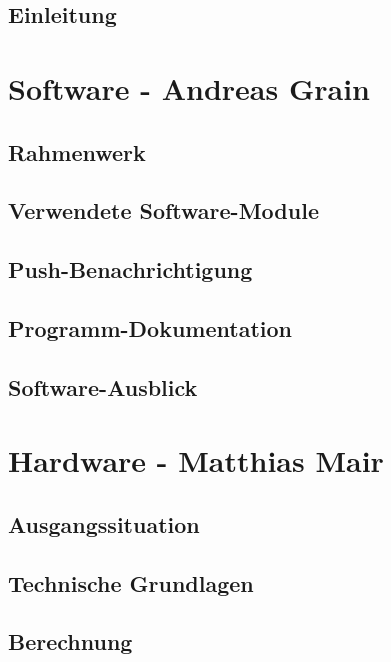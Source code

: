 \documentclass[a4paper, twoside, 12pt, openright]{memoir}
\newcommand{\AndreasGrain}{Andreas Grain}
\newcommand{\MatthiasMair}{Matthias Mair}
\newcommand{\authorName}{\AndreasGrain\ / \MatthiasMair}
\begin{document}
\mainmatter
\chapter{Einleitung}

\cleartoverso

\renewcommand{\authorName}{\AndreasGrain}
\part{Software - \AndreasGrain}
\chapter{Rahmenwerk}

\chapter{Verwendete Software-Module}

\chapter{Push-Benachrichtigung}
\label{ch:push}

\chapter{Programm-Dokumentation}

\chapter{Software-Ausblick}

\cleartoverso

\renewcommand{\authorName}{\MatthiasMair}
\part{Hardware - \MatthiasMair}
\chapter{Ausgangssituation}

\chapter{Technische Grundlagen}

\chapter{Berechnung}

\end{document}
